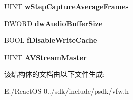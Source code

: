 \begin{DoxyCompactItemize}
\item 
\mbox{\label{structtag_capture_parms_addc1a19f60e409dc191650daf0ce35a9}} 
U\+I\+NT {\bfseries w\+Step\+Capture\+Average\+Frames}
\item 
\mbox{\label{structtag_capture_parms_a8d07c4659012dbefa84fbc93c819727e}} 
D\+W\+O\+RD {\bfseries dw\+Audio\+Buffer\+Size}
\item 
\mbox{\label{structtag_capture_parms_a16183412c985520272c61698f4368ce1}} 
B\+O\+OL {\bfseries f\+Disable\+Write\+Cache}
\item 
\mbox{\label{structtag_capture_parms_a1713bcb7a971f501541a15678280cec5}} 
U\+I\+NT {\bfseries A\+V\+Stream\+Master}
\end{DoxyCompactItemize}


该结构体的文档由以下文件生成\+:\begin{DoxyCompactItemize}
\item 
E\+:/\+React\+O\+S-\/0../sdk/include/psdk/vfw.\+h\end{DoxyCompactItemize}
